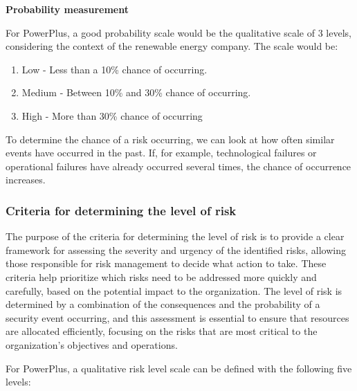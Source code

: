 \textbf{Probability measurement}

For PowerPlus, a good probability scale would be the qualitative scale of 3 levels, considering the context of the renewable energy company. The scale would be:

\begin{enumerate}
    \item Low - Less than a 10\% chance of occurring.
    \item Medium - Between 10\% and 30\% chance of occurring.
    \item High - More than 30\% chance of occurring
\end{enumerate}

To determine the chance of a risk occurring, we can look at how often similar events have occurred in the past. If, for example, technological failures or operational failures have already occurred several times, the chance of occurrence increases.

\subsubsection{Criteria for determining the level of risk}

The purpose of the criteria for determining the level of risk is to provide a clear framework for assessing the severity and urgency of the identified risks, allowing those responsible for risk management to decide what action to take. These criteria help prioritize which risks need to be addressed more quickly and carefully, based on the potential impact to the organization. The level of risk is determined by a combination of the consequences and the probability of a security event occurring, and this assessment is essential to ensure that resources are allocated efficiently, focusing on the risks that are most critical to the organization's objectives and operations.

For PowerPlus, a qualitative risk level scale can be defined with the following five levels:

